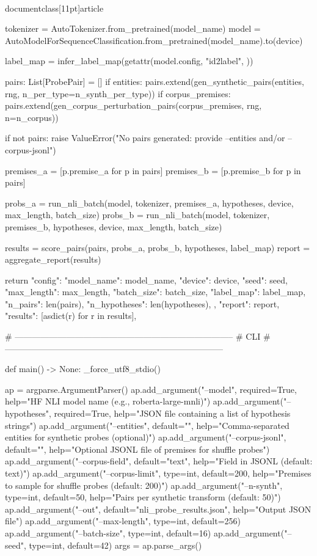 \\documentclass[11pt]{article}
\begin{document}
\begin{CodeBlock}
    tokenizer = AutoTokenizer.from_pretrained(model_name)
    model = AutoModelForSequenceClassification.from_pretrained(model_name).to(device)

    label_map = infer_label_map(getattr(model.config, "id2label", {}))

    pairs: List[ProbePair] = []
    if entities:
        pairs.extend(gen_synthetic_pairs(entities, rng, n_per_type=n_synth_per_type))
    if corpus_premises:
        pairs.extend(gen_corpus_perturbation_pairs(corpus_premises, rng, n=n_corpus))

    if not pairs:
        raise ValueError("No pairs generated: provide --entities and/or --corpus-jsonl")

    premises_a = [p.premise_a for p in pairs]
    premises_b = [p.premise_b for p in pairs]

    probs_a = run_nli_batch(model, tokenizer, premises_a, hypotheses, device, max_length, batch_size)
    probs_b = run_nli_batch(model, tokenizer, premises_b, hypotheses, device, max_length, batch_size)

    results = score_pairs(pairs, probs_a, probs_b, hypotheses, label_map)
    report = aggregate_report(results)

    return {
        "config": {
            "model_name": model_name,
            "device": device,
            "seed": seed,
            "max_length": max_length,
            "batch_size": batch_size,
            "label_map": label_map,
            "n_pairs": len(pairs),
            "n_hypotheses": len(hypotheses),
        },
        "report": report,
        "results": [asdict(r) for r in results],
    }


# -----------------------------------------------------------------------------
# CLI
# -----------------------------------------------------------------------------

def main() -> None:
    _force_utf8_stdio()

    ap = argparse.ArgumentParser()
    ap.add_argument("--model", required=True, help="HF NLI model name (e.g., roberta-large-mnli)")
    ap.add_argument("--hypotheses", required=True, help="JSON file containing a list of hypothesis strings")
    ap.add_argument("--entities", default="", help="Comma-separated entities for synthetic probes (optional)")
    ap.add_argument("--corpus-jsonl", default="", help="Optional JSONL file of premises for shuffle probes")
    ap.add_argument("--corpus-field", default="text", help="Field in JSONL (default: text)")
    ap.add_argument("--corpus-limit", type=int, default=200, help="Premises to sample for shuffle probes (default: 200)")
    ap.add_argument("--n-synth", type=int, default=50, help="Pairs per synthetic transform (default: 50)")
    ap.add_argument("--out", default="nli_probe_results.json", help="Output JSON file")
    ap.add_argument("--max-length", type=int, default=256)
    ap.add_argument("--batch-size", type=int, default=16)
    ap.add_argument("--seed", type=int, default=42)
    args = ap.parse_args()


\end{CodeBlock}
\end{document}

